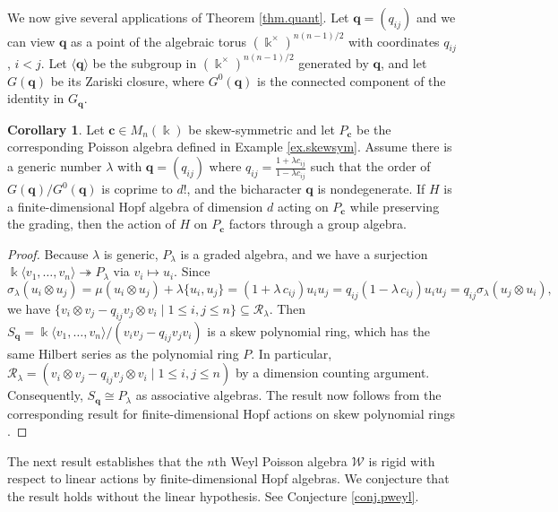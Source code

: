 \documentclass[reqno]{amsart}
\numberwithin{equation}{section}
\theoremstyle{definition}
\newtheorem{corollary}[theorem]{Corollary}
\newcommand\kk{\Bbbk}
\newcommand\cR{\mathcal R}
\newcommand\pw{\mathcal W}
\newcommand\bc{\mathbf c}
\newcommand\bq{\mathbf q}
\newcommand\PC{P_\bc}
\begin{document}
We now give several applications of Theorem \ref{thm.quant}. Let $\bq=(q_{ij})$ and we can view $\bq$ as a point of the algebraic torus $(\kk^\times)^{n(n-1)/2}$ with coordinates $q_{ij}$, $i<j$. Let $\langle \bq\rangle$ be the subgroup in $(\kk^\times)^{n(n-1)/2}$ generated by $\bq$, and let $G(\bq)$ be its Zariski closure, where $G^0(\bq)$ is the connected component of the identity in $G_\bq$.

\begin{corollary}\label{cor.Gskew}
Let $\bc \in M_n(\kk)$ be skew-symmetric and let $\PC$ be the corresponding Poisson algebra defined in Example \ref{ex.skewsym}. Assume there is a generic number $\lambda$ with $\bq=(q_{ij})$ where $q_{ij}=\frac{1+\lambda c_{ij}}{1-\lambda c_{ij}}$ such that the order of $G(\bq)/G^0(\bq)$ is coprime to $d!$, and the bicharacter $\bq$ is nondegenerate. If $H$ is a finite-dimensional Hopf algebra of dimension $d$ acting on $\PC$ while preserving the grading, then the action of $H$ on $\PC$ factors through a group algebra.
\end{corollary}
\begin{proof}
Because $\lambda$ is generic, $P_\lambda$ is a graded algebra, and we have a surjection $\kk\langle v_1,\ldots,v_n\rangle\twoheadrightarrow P_\lambda$ via $v_i\mapsto u_i$. Since
\[
\sigma_\lambda(u_i\otimes u_j)=\mu(u_i\otimes u_j)+\lambda\{u_i,u_j\}=(1+\lambda\,c_{ij})u_iu_j=q_{ij}(1-\lambda\, c_{ij})u_iu_j=q_{ij}\sigma_\lambda(u_j\otimes u_i),
\]
we have $\{v_i\otimes v_j-q_{ij}v_j\otimes v_i \mid 1\le i,j\le n\}\subseteq \cR_\lambda$. 
Then $S_\bq=\kk\langle v_1,\ldots,v_n\rangle/(v_iv_j-q_{ij}v_jv_i)$ is a skew polynomial ring, which has the same Hilbert series as the polynomial ring $P$. In particular, $\cR_\lambda=(v_i\otimes v_j-q_{ij}v_j\otimes v_i \mid 1\le i,j\le n)$ by a dimension counting argument. Consequently, $S_\bq \cong P_\lambda$ as associative algebras. The result now follows from the corresponding result for finite-dimensional Hopf actions on skew polynomial rings \cite[Theorem  1.9]{EW2016}.
\end{proof}


The next result establishes that the $n$th Weyl Poisson algebra $\pw$ is rigid with respect to linear actions by finite-dimensional Hopf algebras. We conjecture that the result holds without the linear hypothesis. See Conjecture \ref{conj.pweyl}.
\end{document}
